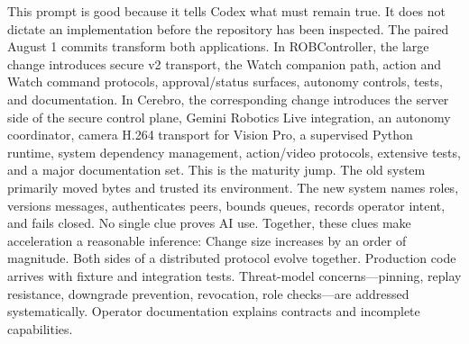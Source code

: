 {}This prompt is good because it tells Codex what must remain true. It does not\markdownRendererSoftLineBreak
{}dictate an implementation before the repository has been inspected.\markdownRendererInterblockSeparator
{}\markdownRendererThematicBreak{}\markdownRendererInterblockSeparator
{}
\markdownRendererSectionEnd 
\markdownRendererSectionEnd \markdownRendererSectionBegin
{}\markdownRendererInterblockSeparator
{}The paired August 1 commits transform both applications.\markdownRendererParagraphSeparator
{}In ROBController, the large change introduces secure v2 transport, the Watch\markdownRendererSoftLineBreak
{}companion path, action and Watch command protocols, approval/status surfaces,\markdownRendererSoftLineBreak
{}autonomy controls, tests, and documentation.\markdownRendererParagraphSeparator
{}In Cerebro, the corresponding change introduces the server side of the secure\markdownRendererSoftLineBreak
{}control plane, Gemini Robotics Live integration, an autonomy coordinator,\markdownRendererSoftLineBreak
{}camera H.264 transport for Vision Pro, a supervised Python runtime, system\markdownRendererSoftLineBreak
{}dependency management, action/video protocols, extensive tests, and a major\markdownRendererSoftLineBreak
{}documentation set.\markdownRendererParagraphSeparator
{}This is the maturity jump. The old system primarily moved bytes and trusted its\markdownRendererSoftLineBreak
{}environment. The new system names roles, versions messages, authenticates\markdownRendererSoftLineBreak
{}peers, bounds queues, records operator intent, and fails closed.\markdownRendererInterblockSeparator
{}\markdownRendererSectionBegin
{}\markdownRendererInterblockSeparator
{}No single clue proves AI use. Together, these clues make acceleration a\markdownRendererSoftLineBreak
{}reasonable inference:\markdownRendererInterblockSeparator
{}\markdownRendererOlBegin
{}Change size increases by an order of magnitude.\markdownRendererOlItemEnd 
{}Both sides of a distributed protocol evolve together.\markdownRendererOlItemEnd 
{}Production code arrives with fixture and integration tests.\markdownRendererOlItemEnd 
{}Threat-model concerns—pinning, replay resistance, downgrade prevention,\markdownRendererSoftLineBreak
{}revocation, role checks—are addressed systematically.\markdownRendererOlItemEnd 
{}Operator documentation explains contracts and incomplete capabilities.\markdownRendererOlItemEnd 
